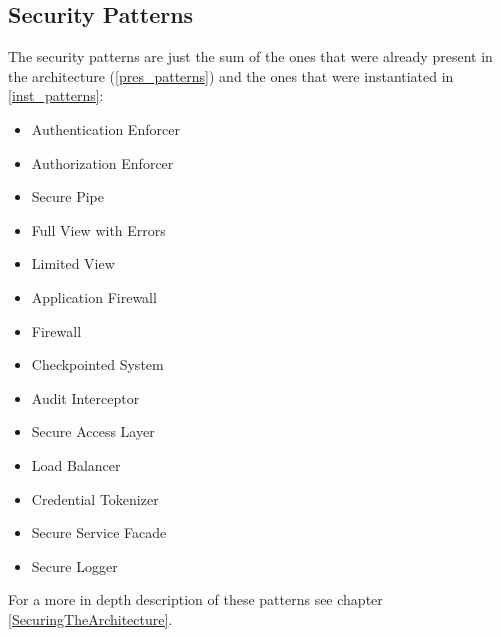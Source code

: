 \documentclass[a4paper,11pt]{report}
\begin{document}
\subsection{Security Patterns}
The security patterns are just the sum of the ones that were already present in the architecture
(\ref{pres_patterns}) and the ones that were instantiated in \ref{inst_patterns}:
\begin{itemize}
\item Authentication Enforcer
\item Authorization Enforcer
\item Secure Pipe
\item Full View with Errors
\item Limited View
\item Application Firewall
\item Firewall
\item Checkpointed System
\item Audit Interceptor
\item Secure Access Layer
\item Load Balancer
\item Credential Tokenizer
\item Secure Service Facade
\item Secure Logger
\end{itemize}
For a more in depth description of these patterns see chapter \ref{SecuringTheArchitecture}.
\end{document}
